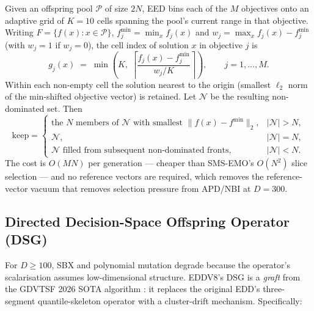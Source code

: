 \documentclass[preprint,12pt]{elsarticle}
\begin{document}
Given an offspring pool $\mathcal{P}$ of size $2N$, EED bins each of the $M$
objectives onto an adaptive grid of $K = 10$ cells spanning the pool's
current range in that objective. Writing $F = \{f(x) : x \in \mathcal{P}\}$,
$f^{\min}_j = \min_{x} f_j(x)$ and $w_j = \max_x f_j(x) - f^{\min}_j$ (with
$w_j = 1$ if $w_j = 0$), the cell index of solution $x$ in objective $j$ is
\begin{equation}
g_j(x) \;=\; \min\!\left(K,\; \left\lceil \frac{f_j(x) - f^{\min}_j}{w_j / K} \right\rceil\right),
\qquad j = 1,\dots,M .
\label{eq:grid}
\end{equation}
Within each non-empty cell the solution nearest to the origin (smallest
$\ell_2$ norm of the min-shifted objective vector) is retained. Let
$\mathcal{N}$ be the resulting non-dominated set. Then
\begin{equation}
\text{keep} =
\begin{cases}
\text{the } N \text{ members of } \mathcal{N} \text{ with smallest } \|f(x) - f^{\min}\|_2, & |\mathcal{N}| > N,\\[2pt]
\mathcal{N}, & |\mathcal{N}| = N,\\[2pt]
\mathcal{N} \text{ filled from subsequent non-dominated fronts}, & |\mathcal{N}| < N.
\end{cases}
\label{eq:eedselect}
\end{equation}
The cost is $O(MN)$ per generation --- cheaper than SMS-EMO's $O(N^2)$ slice
selection --- and no reference vectors are required, which removes the
reference-vector vacuum that removes selection pressure from APD/NBI at
$D = 300$.

\subsection{Directed Decision-Space Offspring Operator (DSG)}
\label{sec:dsg}

For $D \ge 100$, SBX and polynomial mutation degrade because the operator's
scalarisation assumes low-dimensional structure. EDDV8's DSG is a
\emph{graft} from the GDVTSF 2026 SOTA algorithm \cite{gdvtsf2026}: it
replaces the original EDD's three-segment quantile-skeleton operator with a
cluster-drift mechanism. Specifically:
\end{document}
